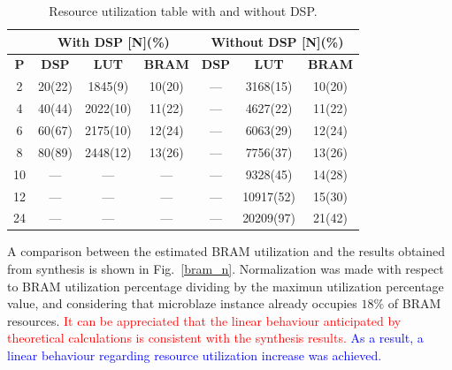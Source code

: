 \documentclass[conference,compsoc]{IEEEtran}
\begin{document}
\begin{table}[!t]
\renewcommand{\arraystretch}{1.3}
\caption{Resource utilization table with and without DSP.}
\label{res_table}
\centering
\begin{tabular}{|c|c|c|c|c|c|c|}
  \hline
  & \multicolumn{3}{c|}{\textbf{With DSP [N](\%)}} & \multicolumn{3}{c|}{\textbf{Without DSP [N](\%)}} \\ \hline
  \textbf{P}  & \textbf{DSP}            & \textbf{LUT}        & \textbf{BRAM}       & \textbf{DSP}         & \textbf{LUT}           & \textbf{BRAM}         \\ \hline
  2  & 20(22)         & 1845(9)    & 10(20)     & ---         & 3168(15)      & 10(20)         \\ \hline
  4  & 40(44)         & 2022(10)   & 11(22)     & ---         & 4627(22)      & 11(22)         \\ \hline
  6  & 60(67)         & 2175(10)   & 12(24)     & ---         & 6063(29)      & 12(24)         \\ \hline
  8  & 80(89)         & 2448(12)   & 13(26)     & ---         & 7756(37)      & 13(26)         \\ \hline
  10 & ---            & ---        & ---        & ---         & 9328(45)      & 14(28)         \\ \hline
  12 & ---            & ---        & ---        & ---         & 10917(52)     & 15(30)         \\ \hline
  24 & ---            & ---        & ---        & ---         & 20209(97)     & 21(42)         \\ \hline
\end{tabular}           
\end{table}

A comparison between the estimated BRAM utilization and the results obtained
from synthesis is shown in Fig.~\ref{bram_n}. Normalization was made with
respect to BRAM utilization percentage dividing by the maximun utilization
percentage value, and considering that microblaze instance already occupies $18\%$
of BRAM resources. \textcolor{red}{It can be appreciated that the linear
  behaviour anticipated by theoretical calculations is consistent with the
  synthesis results.} \textcolor{blue}{As a result, a linear behaviour regarding resource utilization increase was
achieved.}
\end{document}
